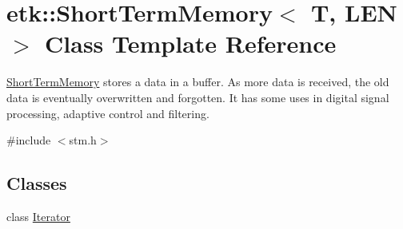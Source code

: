 \hypertarget{classetk_1_1_short_term_memory}{\section{etk\-:\-:Short\-Term\-Memory$<$ T, L\-E\-N $>$ Class Template Reference}
\label{classetk_1_1_short_term_memory}
}


\hyperlink{classetk_1_1_short_term_memory}{Short\-Term\-Memory} stores a data in a buffer. As more data is received, the old data is eventually overwritten and forgotten. It has some uses in digital signal processing, adaptive control and filtering.  




{\ttfamily \#include $<$stm.\-h$>$}

\subsection*{Classes}
\begin{DoxyCompactItemize}
\item 
class \hyperlink{classetk_1_1_short_term_memory_1_1_iterator}{Iterator}
\end{DoxyCompactItemize}
